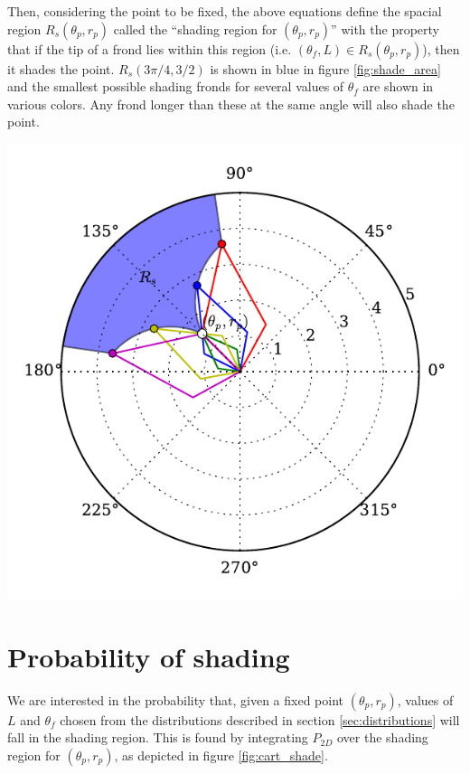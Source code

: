 \documentclass[10pt]{article}
\newenvironment{mcfig}
	{\par\medskip\noindent\minipage{\linewidth}}
	{\endminipage\par\medskip}
\begin{document}
\begin{multicols}{2}
Then, considering the point to be fixed, the above equations define the spacial region $R_s(\theta_p,r_p)$ called the ``shading region for $(\theta_p,r_p)$'' with the property that if the tip of a frond lies within this region (i.e. $(\theta_f,L) \in R_s(\theta_p,r_p)$), then it shades the point.
$R_s(3\pi/4,3/2)$ is shown in blue in figure \ref{fig:shade_area} and the smallest possible shading fronds for several values of $\theta_f$ are shown in various colors.
Any frond longer than these at the same angle will also shade the point.

\begin{mcfig}
	\centering
	\includegraphics[width=\linewidth]{shade_area}
	\vspace{-2em}
	\label{fig:shade_area}
\end{mcfig}

\section{Probability of shading}
We are interested in the probability that, given a fixed point $(\theta_p,r_p)$, values of $L$ and $\theta_f$ chosen from the distributions described in section \ref{sec:distributions} will fall in the shading region.
This is found by integrating $P_{2D}$ over the shading region for $(\theta_p,r_p)$, as depicted in figure \ref{fig:cart_shade}.


\end{multicols}
\end{document}
